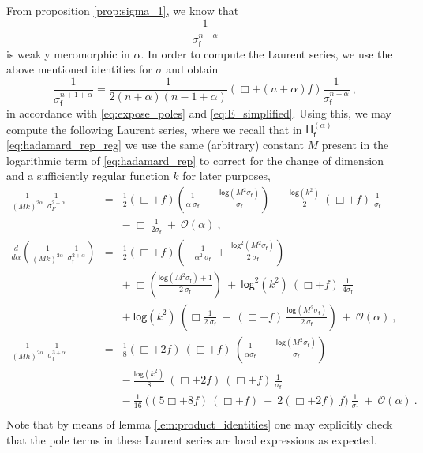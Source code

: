 \documentclass[11pt]{book}
\renewcommand{\log}{\mathsf{log}}
\newcommand{\Ocal}{\mathcal{O}}
\newcommand{\Hsf}{\mathsf{H}}
\newcommand{\fsf}{\mathsf{f}}
\theoremstyle{break}
\begin{document}
From proposition \ref{prop:sigma_1}, we know that
%
\begin{equation*}
\frac{1}{\sigma^{n+\alpha}_\fsf} 
\end{equation*}
%
is weakly meromorphic in $\alpha$. In order to compute the Laurent series, we use the above mentioned identities for $\sigma$ and obtain
%
\begin{equation*}
\frac{1}{\sigma^{n+1+\alpha}_\fsf} = \frac{1}{2(n+\alpha)(n-1+\alpha)} \left(\Box+(n+\alpha)f\right) \frac{1}{\sigma^{n+\alpha}_\fsf} \ ,
\end{equation*}
%
in accordance with \eqref{eq:expose_poles} and \eqref{eq:E_simplified}. Using this, we may compute the following Laurent series, where we recall that in $\Hsf^{(\alpha)}_\fsf$ \eqref{eq:hadamard_rep_reg} we use the same (arbitrary) constant $M$ present in the logarithmic term  of \eqref{eq:hadamard_rep} to correct for the change of dimension and a sufficiently regular function $k$ for later purposes,
%
\begin{eqnarray}
\frac{1}{(Mk)^{2\alpha}} \ \frac{1}{\sigma^{2+\alpha}_F} &=& \frac12 \left(\Box+f\right) \left( \frac{1}{\alpha \ \sigma_\fsf} \ - \ \frac{\log\left(M^2 \sigma_\fsf\right)}{\sigma_\fsf}\right) \ - \ \frac{\log(k^2)}{2} \ \left(\Box+f\right) \ \frac{1}{\sigma_\fsf} \nonumber \\
&& - \ \Box \ \frac{1}{2\sigma_\fsf} \ + \ \Ocal(\alpha) \ , \nonumber \\
%
%
\frac{d}{d\alpha} \left( \frac{1}{(Mk)^{2\alpha}} \ \frac{1}{\sigma^{2+\alpha}_\fsf} \right) &=& \frac12 \left(\Box+f\right) \left(-\frac{1}{\alpha^2 \ \sigma_\fsf} \ + \ \frac{\log^2\left(M^2 \sigma_\fsf\right)}{2 \ \sigma_\fsf}\right)  \nonumber \\
&& + \ \Box\left(\frac{\log\left(M^2 \sigma_\fsf\right)+1}{2 \ \sigma_\fsf}\right) \ + \ \log^2(k^2) \ \left(\Box+f\right) \ \frac{1}{4\sigma_\fsf} \nonumber \\
&& + \ \log(k^2) \ \left(\Box\frac{1}{2 \ \sigma_\fsf} \ + \ \left(\Box+f\right) \ \frac{\log\left(M^2 \sigma_\fsf\right)}{2 \ \sigma_\fsf}\right) \ + \ \Ocal(\alpha) \ , \nonumber \\
%
%
\frac{1}{(M h)^{2\alpha}} \ \frac{1}{\sigma^{3+\alpha}_\fsf} &=& \frac18 \left(\Box+2f\right) \ \left(\Box+f\right) \ \left(\frac{1}{\alpha\sigma_\fsf} \ - \ \frac{\log \left(M^2 \sigma_\fsf\right)}{\sigma_\fsf}\right) \nonumber \\
&& - \ \frac{\log(k^2)}{8} \ (\Box+2f) \ (\Box+f) \ \frac{1}{\sigma_\fsf} \nonumber \\
&& - \ \frac{1}{16} \ \bigg( (5\Box+8f) \ (\Box+f) \ - \ 2 (\Box+2f) \ f \bigg) \ \frac{1}{\sigma_\fsf} \ + \ \Ocal(\alpha) \ . \nonumber \\
\label{eq:general_expansion}
\end{eqnarray}
%
Note that by means of lemma \ref{lem:product_identities} one may explicitly check that the pole terms in these Laurent series are local expressions as expected.
\end{document}
